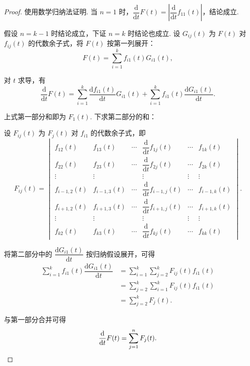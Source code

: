 \begin{proof}
    使用数学归纳法证明. 当 $n=1$ 时，$\dfrac{\mathrm{d}}{\mathrm{d}t}F(t) = \left\lvert \dfrac{\mathrm{d}}{\mathrm{d}t}f_{11}(t) \right\rvert$，结论成立.

    假设 $n=k-1$ 时结论成立，下证 $n=k$ 时结论也成立. 设 $G_{ij}(t)$ 为 $F(t)$ 对 $f_{ij}(t)$ 的代数余子式，将 $F(t)$ 按第一列展开：
    \[
        F(t) = \sum_{i=1}^k f_{i1}(t) G_{i1}(t),
    \]

    对 $t$ 求导，有
    \[
        \dfrac{\mathrm{d}}{\mathrm{d}t}F(t) = \sum_{i=1}^k \dfrac{\mathrm{d}f_{i1}(t)}{\mathrm{d}t} G_{i1}(t) + \sum_{i=1}^k f_{i1}(t) \dfrac{\mathrm{d}G_{i1}(t)}{\mathrm{d}t}.
    \]

    上式第一部分和即为 $F_1(t)$. 下求第二部分的和：

    设 $F_{ij}(t)$ 为 $F_j(t)$ 对 $f_{i1}$ 的代数余子式，即
    \[
        F_{ij}(t) = \begin{vmatrix}
            f_{12}(t) & f_{13}(t) & \cdots & \dfrac{\mathrm{d}}{\mathrm{d}t}f_{1j}(t) & \cdots & f_{1k}(t) \\[2ex]
            f_{22}(t) & f_{23}(t) & \cdots & \dfrac{\mathrm{d}}{\mathrm{d}t}f_{2j}(t) & \cdots & f_{2k}(t) \\[2ex]
            \vdots    & \vdots    &        & \vdots                                   & \vdots & \vdots    \\[2ex]
            f_{i-1,2}(t) & f_{i-1,3}(t) & \cdots & \dfrac{\mathrm{d}}{\mathrm{d}t}f_{i-1,j}(t) & \cdots & f_{i-1,k}(t) \\[2ex]
            f_{i+1,2}(t) & f_{i+1,3}(t) & \cdots & \dfrac{\mathrm{d}}{\mathrm{d}t}f_{i+1,j}(t) & \cdots & f_{i+1,k}(t) \\[2ex]
            \vdots    & \vdots    &        & \vdots                                   & \vdots & \vdots    \\[2ex]
            f_{k2}(t) & f_{k3}(t) & \cdots & \dfrac{\mathrm{d}}{\mathrm{d}t}f_{kj}(t) & \cdots & f_{kk}(t)
        \end{vmatrix}.
    \]

    将第二部分中的 $\dfrac{\mathrm{d}G_{i1}(t)}{\mathrm{d}t}$ 按归纳假设展开，可得
    \begin{align*}
        \sum_{i=1}^k f_{i1}(t) \dfrac{\mathrm{d}G_{i1}(t)}{\mathrm{d}t}
        &= \sum_{i=1}^k \sum_{j=2}^k F_{ij}(t) f_{i1}(t) \\
        &= \sum_{j=2}^k \sum_{i=1}^k F_{ij}(t) f_{i1}(t) \\
        &= \sum_{j=2}^k F_j(t).
    \end{align*}

    与第一部分合并可得
    \[
        \dfrac{\mathrm{d}}{\mathrm{d}t}F(t)=\sum\limits_{j=1}^nF_j(t). \qedhere
    \]
\end{proof}

